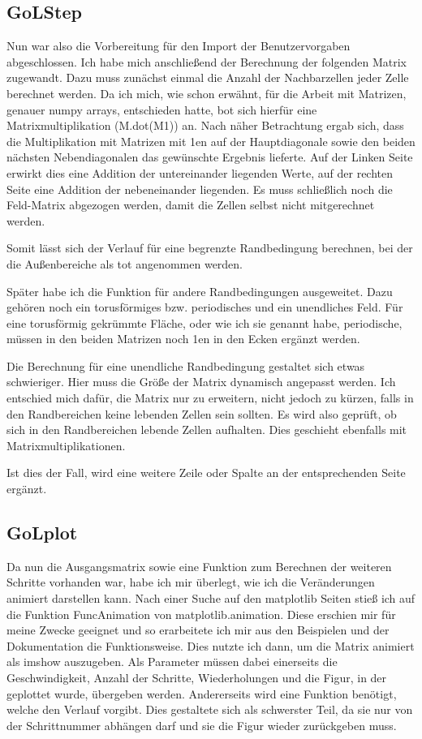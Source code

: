 \documentclass{scrartcl}
\begin{document}
\subsection{GoLStep}
Nun war also die Vorbereitung für den Import der Benutzervorgaben abgeschlossen. Ich habe mich anschließend der Berechnung der folgenden Matrix zugewandt. Dazu muss zunächst einmal die Anzahl der Nachbarzellen jeder Zelle berechnet werden. Da ich mich, wie schon erwähnt, für die Arbeit mit Matrizen, genauer numpy arrays, entschieden hatte, bot sich hierfür eine Matrixmultiplikation (M.dot(M1)) an. Nach näher Betrachtung ergab sich, dass die Multiplikation mit Matrizen mit 1en auf der Hauptdiagonale sowie den beiden nächsten Nebendiagonalen das gewünschte Ergebnis lieferte. Auf der Linken Seite  erwirkt dies eine Addition der untereinander liegenden Werte, auf der rechten Seite eine Addition der nebeneinander liegenden. Es muss schließlich noch die Feld-Matrix abgezogen werden, damit die Zellen selbst nicht mitgerechnet werden.

Somit lässt sich der Verlauf für eine begrenzte Randbedingung berechnen, bei der die Außenbereiche als tot angenommen werden. 

Später habe ich die Funktion für andere Randbedingungen ausgeweitet. Dazu gehören noch ein torusförmiges bzw. periodisches und ein unendliches Feld.
Für eine torusförmig gekrümmte Fläche, oder wie ich sie genannt habe, periodische, müssen in den beiden Matrizen noch 1en in den Ecken ergänzt werden.

Die Berechnung für eine unendliche Randbedingung gestaltet sich etwas schwieriger. Hier muss die Größe der Matrix dynamisch angepasst werden. Ich entschied mich dafür, die Matrix nur zu erweitern, nicht jedoch zu kürzen, falls in den Randbereichen keine lebenden Zellen sein sollten. Es wird also geprüft, ob sich in den Randbereichen lebende Zellen aufhalten. Dies geschieht ebenfalls mit Matrixmultiplikationen. 

Ist dies der Fall, wird eine weitere Zeile oder Spalte an der entsprechenden Seite ergänzt.

\subsection{GoLplot}
Da nun die Ausgangsmatrix sowie eine Funktion zum Berechnen der weiteren Schritte vorhanden war, habe ich mir überlegt, wie ich die Veränderungen animiert darstellen kann. Nach einer Suche auf den matplotlib Seiten stieß ich auf die Funktion FuncAnimation von matplotlib.animation. Diese erschien mir für meine Zwecke geeignet und so erarbeitete ich mir aus den Beispielen und der Dokumentation die Funktionsweise. Dies nutzte ich dann, um die Matrix animiert als imshow auszugeben. Als Parameter müssen dabei einerseits die Geschwindigkeit, Anzahl der Schritte, Wiederholungen und die Figur, in der geplottet wurde, übergeben werden. Andererseits wird eine Funktion benötigt, welche den Verlauf vorgibt. Dies gestaltete sich als schwerster Teil, da sie nur von der Schrittnummer abhängen darf und sie die Figur wieder zurückgeben muss.
\end{document}
